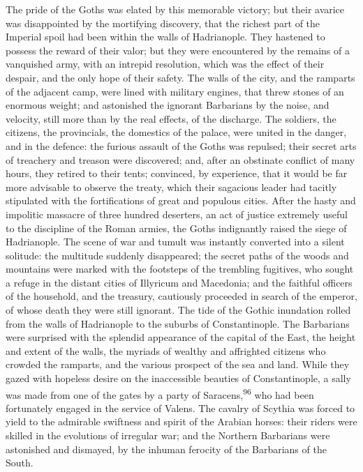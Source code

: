 
The pride of the Goths was elated by this memorable victory; but
their avarice was disappointed by the mortifying discovery, that
the richest part of the Imperial spoil had been within the walls
of Hadrianople. They hastened to possess the reward of their
valor; but they were encountered by the remains of a vanquished
army, with an intrepid resolution, which was the effect of their
despair, and the only hope of their safety. The walls of the
city, and the ramparts of the adjacent camp, were lined with
military engines, that threw stones of an enormous weight; and
astonished the ignorant Barbarians by the noise, and velocity,
still more than by the real effects, of the discharge. The
soldiers, the citizens, the provincials, the domestics of the
palace, were united in the danger, and in the defence: the
furious assault of the Goths was repulsed; their secret arts of
treachery and treason were discovered; and, after an obstinate
conflict of many hours, they retired to their tents; convinced,
by experience, that it would be far more advisable to observe the
treaty, which their sagacious leader had tacitly stipulated with
the fortifications of great and populous cities. After the hasty
and impolitic massacre of three hundred deserters, an act of
justice extremely useful to the discipline of the Roman armies,
the Goths indignantly raised the siege of Hadrianople. The scene
of war and tumult was instantly converted into a silent solitude:
the multitude suddenly disappeared; the secret paths of the woods
and mountains were marked with the footsteps of the trembling
fugitives, who sought a refuge in the distant cities of Illyricum
and Macedonia; and the faithful officers of the household, and
the treasury, cautiously proceeded in search of the emperor, of
whose death they were still ignorant. The tide of the Gothic
inundation rolled from the walls of Hadrianople to the suburbs of
Constantinople. The Barbarians were surprised with the splendid
appearance of the capital of the East, the height and extent of
the walls, the myriads of wealthy and affrighted citizens who
crowded the ramparts, and the various prospect of the sea and
land. While they gazed with hopeless desire on the inaccessible
beauties of Constantinople, a sally was made from one of the
gates by a party of Saracens,\textsuperscript{96} who had been fortunately engaged
in the service of Valens. The cavalry of Scythia was forced to
yield to the admirable swiftness and spirit of the Arabian
horses: their riders were skilled in the evolutions of irregular
war; and the Northern Barbarians were astonished and dismayed, by
the inhuman ferocity of the Barbarians of the South.

